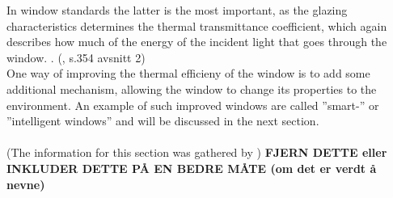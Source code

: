 In window standards the latter is the most important, as the glazing characteristics
determines the thermal transmittance coefficient, which again describes how much
of the energy of the incident light that goes through the window.
 \cite{Tarantini2011}.
(\cite{Kamalisarvestani2013}, s.354 avsnitt 2)\\
%
One way of improving the thermal efficieny of the window is to add some additional mechanism,
allowing the window to change its properties to the environment. An example of such improved 
windows are called ''smart-'' or ''intelligent windows'' and will be discussed in the next section.
\\
\\
(The information for this section was gathered by \cite{Kamalisarvestani2013}) \textbf{FJERN DETTE eller 
INKLUDER DETTE PÅ EN BEDRE MÅTE (om det er verdt å nevne) }

